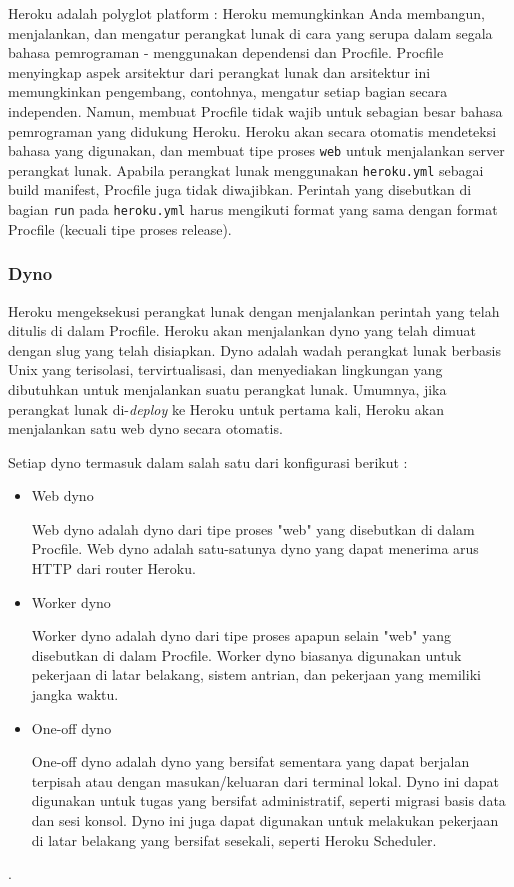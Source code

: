 Heroku adalah polyglot platform : Heroku memungkinkan Anda membangun, menjalankan, dan mengatur perangkat lunak di cara yang serupa dalam segala bahasa pemrograman - menggunakan dependensi dan Procfile. Procfile menyingkap aspek arsitektur dari perangkat lunak dan arsitektur ini memungkinkan pengembang, contohnya, mengatur setiap bagian secara independen. Namun, membuat Procfile tidak wajib untuk sebagian besar bahasa pemrograman yang didukung Heroku. Heroku akan secara otomatis mendeteksi bahasa yang digunakan, dan membuat tipe proses \texttt{web} untuk menjalankan server perangkat lunak. Apabila perangkat lunak menggunakan \texttt{heroku.yml} sebagai build manifest, Procfile juga tidak diwajibkan. Perintah yang disebutkan di bagian \texttt{run} pada \texttt{heroku.yml} harus mengikuti format yang sama dengan format Procfile (kecuali tipe proses release).

\subsubsection{Dyno}
Heroku mengeksekusi perangkat lunak dengan menjalankan perintah yang telah ditulis di dalam Procfile. Heroku akan menjalankan dyno yang telah dimuat dengan slug yang telah disiapkan. Dyno adalah wadah perangkat lunak berbasis Unix yang terisolasi, tervirtualisasi, dan menyediakan lingkungan yang dibutuhkan untuk menjalankan suatu perangkat lunak. Umumnya, jika perangkat lunak di-\textit{deploy} ke Heroku untuk pertama kali, Heroku akan menjalankan satu web dyno secara otomatis.

Setiap dyno termasuk dalam salah satu dari konfigurasi berikut :
\begin{itemize}
\item Web dyno

Web dyno adalah dyno dari tipe proses "web" yang disebutkan di dalam Procfile. Web dyno adalah satu-satunya dyno yang dapat menerima arus HTTP dari router Heroku.

\item Worker dyno

Worker dyno adalah dyno dari tipe proses apapun selain "web" yang disebutkan di dalam Procfile. Worker dyno biasanya digunakan untuk pekerjaan di latar belakang, sistem antrian, dan pekerjaan yang memiliki jangka waktu.
\item One-off dyno

One-off dyno adalah dyno yang bersifat sementara yang dapat berjalan terpisah atau dengan masukan/keluaran dari terminal lokal. Dyno ini dapat digunakan untuk tugas yang bersifat administratif, seperti migrasi basis data dan sesi konsol. Dyno ini juga dapat digunakan untuk melakukan pekerjaan di latar belakang yang bersifat sesekali, seperti Heroku Scheduler.

\end{itemize}. 

